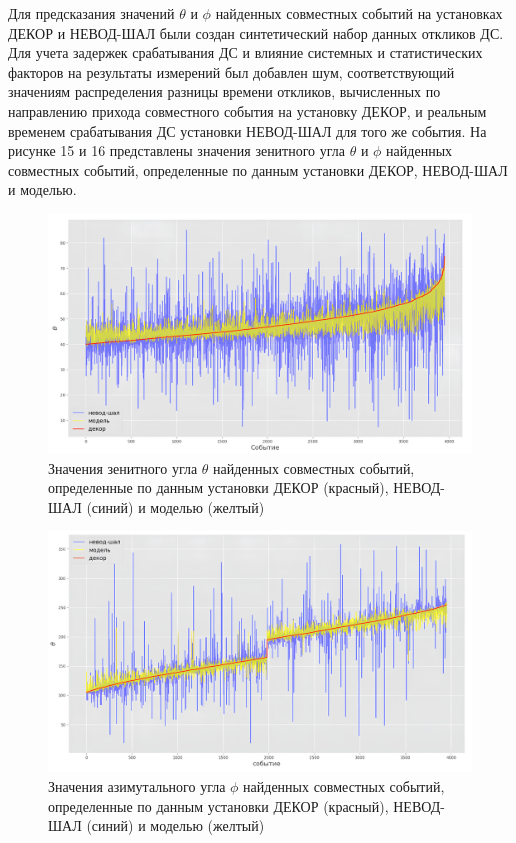Для предсказания значений \(\theta\) и \(\phi\) найденных совместных событий на установках ДЕКОР и НЕВОД-ШАЛ были создан синтетический набор данных откликов ДС. Для учета задержек срабатывания ДС и влияние системных и статистических факторов на результаты измерений был добавлен шум, соответствующий значениям распределения разницы времени откликов, вычисленных по направлению прихода совместного события на установку ДЕКОР, и реальным временем срабатывания ДС установки НЕВОД-ШАЛ для того же события. На рисунке 15 и 16 представлены значения зенитного угла \(\theta\) и \(\phi\) найденных совместных событий, определенные по данным установки ДЕКОР, НЕВОД-ШАЛ и моделью. 
\begin{figure}[ht]
    \centering
    \includegraphics[width=1\textwidth]{images/theta_3_1.png}
    \caption{Значения зенитного угла \(\theta\) найденных совместных событий, определенные по данным установки ДЕКОР (красный), НЕВОД-ШАЛ (синий) и моделью (желтый)}
    \label{fig:theta}
\end{figure}

\begin{figure}[ht]
    \centering
    \includegraphics[width=1\textwidth]{images/phi_3_1.png}
    \caption{Значения азимутального угла \(\phi\) найденных совместных событий, определенные по данным установки ДЕКОР (красный), НЕВОД-ШАЛ (синий) и моделью (желтый)}
    \label{fig:phi}
\end{figure}

